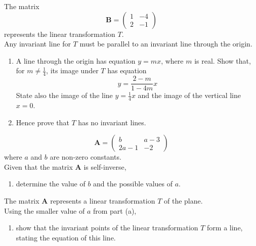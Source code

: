 \documentclass[leqno]{article}
\begin{document}
\begin{enumerate}[
  label=\textbf{\arabic*.},
  leftmargin=*,
  topsep=0pt,
  partopsep=0pt,
  parsep=0pt
]
\newpage

\questionitem

The matrix
\[
\mathbf{B} = \begin{pmatrix} 1 & -4 \\ 2 & -1 \end{pmatrix}
\]
represents the linear transformation $T$. \\
Any invariant line for $T$ must be parallel to an invariant line through the origin. \\
\begin{enumerate}[label=\textbf{(\alph*)}]
  \item A line through the origin has equation $y=mx$, where $m$ is real. Show that, for $m \ne \tfrac{1}{4}$, its image under $T$ has equation
  \[
  y = \frac{2-m}{1-4m}x
  \]
  State also the image of the line $y=\tfrac{1}{4}x$ and the image of the vertical line $x=0$. \\
  \item Hence prove that $T$ has no invariant lines.  \\
\end{enumerate}

\newpage

\questionitem

\[
\mathbf{A} = \begin{pmatrix} b & a - 3 \\[6pt] 2a - 1 & -2 \end{pmatrix}
\]
where $a$ and $b$ are non-zero constants. \\
Given that the matrix $\mathbf{A}$ is self-inverse, \\
\begin{enumerate}[label=\textbf{(\alph*)}]
  \item determine the value of $b$ and the possible values of $a$.  \\
\end{enumerate}
The matrix $\mathbf{A}$ represents a linear transformation $T$ of the plane. \\
Using the smaller value of $a$ from part (a), \\
\begin{enumerate}[label=\textbf{(\alph*)}, resume]
  \item show that the invariant points of the linear transformation $T$ form a line, stating the equation of this line.  \\
\end{enumerate}


\end{enumerate}
\end{document}
